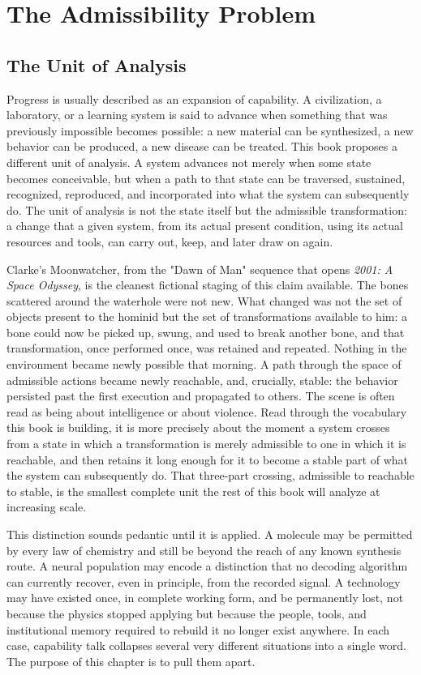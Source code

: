 \documentclass[11pt]{book}
\begin{document}
\chapter{The Admissibility Problem}

\section{The Unit of Analysis}

Progress is usually described as an expansion of capability. A civilization, a laboratory, or a learning system is said to advance when something that was previously impossible becomes possible: a new material can be synthesized, a new behavior can be produced, a new disease can be treated. This book proposes a different unit of analysis. A system advances not merely when some state becomes conceivable, but when a path to that state can be traversed, sustained, recognized, reproduced, and incorporated into what the system can subsequently do. The unit of analysis is not the state itself but the admissible transformation: a change that a given system, from its actual present condition, using its actual resources and tools, can carry out, keep, and later draw on again.

Clarke's Moonwatcher, from the "Dawn of Man" sequence that opens \emph{2001: A Space Odyssey}, is the cleanest fictional staging of this claim available. The bones scattered around the waterhole were not new. What changed was not the set of objects present to the hominid but the set of transformations available to him: a bone could now be picked up, swung, and used to break another bone, and that transformation, once performed once, was retained and repeated. Nothing in the environment became newly possible that morning. A path through the space of admissible actions became newly reachable, and, crucially, stable: the behavior persisted past the first execution and propagated to others. The scene is often read as being about intelligence or about violence. Read through the vocabulary this book is building, it is more precisely about the moment a system crosses from a state in which a transformation is merely admissible to one in which it is reachable, and then retains it long enough for it to become a stable part of what the system can subsequently do. That three-part crossing, admissible to reachable to stable, is the smallest complete unit the rest of this book will analyze at increasing scale.

This distinction sounds pedantic until it is applied. A molecule may be permitted by every law of chemistry and still be beyond the reach of any known synthesis route. A neural population may encode a distinction that no decoding algorithm can currently recover, even in principle, from the recorded signal. A technology may have existed once, in complete working form, and be permanently lost, not because the physics stopped applying but because the people, tools, and institutional memory required to rebuild it no longer exist anywhere. In each case, capability talk collapses several very different situations into a single word. The purpose of this chapter is to pull them apart.
\end{document}
